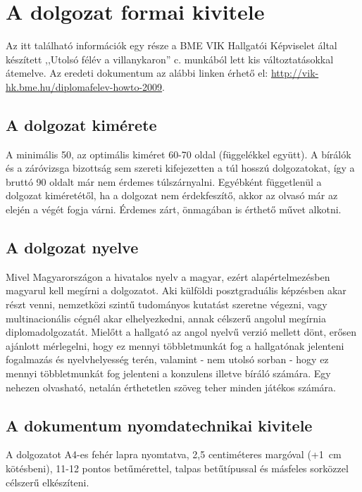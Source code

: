 \chapter{A dolgozat formai kivitele}
Az itt található információk egy része a BME VIK Hallgatói Képviselet által készített ,,Utolsó félév a villanykaron'' c. munkából lett kis változtatásokkal átemelve. Az eredeti dokumentum az alábbi linken érhető el: \url{http://vik-hk.bme.hu/diplomafelev-howto-2009}.

\section{A dolgozat kimérete}
A minimális 50, az optimális kiméret 60-70 oldal (függelékkel együtt). A bírálók és a záróvizsga bizottság sem szereti kifejezetten a túl hosszú dolgozatokat, így a bruttó 90 oldalt már nem érdemes túlszárnyalni. Egyébként függetlenül a dolgozat kiméretétől, ha a dolgozat nem érdekfeszítő, akkor az olvasó már az elején a végét fogja várni. Érdemes zárt, önmagában is érthető művet alkotni.

\section{A dolgozat nyelve}
Mivel Magyarországon a hivatalos nyelv a magyar, ezért alapértelmezésben magyarul kell megírni a dolgozatot. Aki külföldi posztgraduális képzésben akar részt venni, nemzetközi szintű tudományos kutatást szeretne végezni, vagy multinacionális cégnél akar elhelyezkedni, annak célszerű angolul megírnia diplomadolgozatát. Mielőtt a hallgató az angol nyelvű verzió mellett dönt, erősen ajánlott mérlegelni, hogy ez mennyi többletmunkát fog a hallgatónak jelenteni fogalmazás és nyelvhelyesség terén, valamint - nem utolsó sorban - hogy ez mennyi többletmunkát fog jelenteni a konzulens illetve bíráló számára. Egy nehezen olvasható, netalán érthetetlen szöveg teher minden játékos számára.

\section{A dokumentum nyomdatechnikai kivitele}
A dolgozatot A4-es fehér lapra nyomtatva, 2,5 centiméteres margóval (+1~cm kötésbeni), 11-12 pontos betűmérettel, talpas betűtípussal és másfeles sorközzel célszerű elkészíteni.


